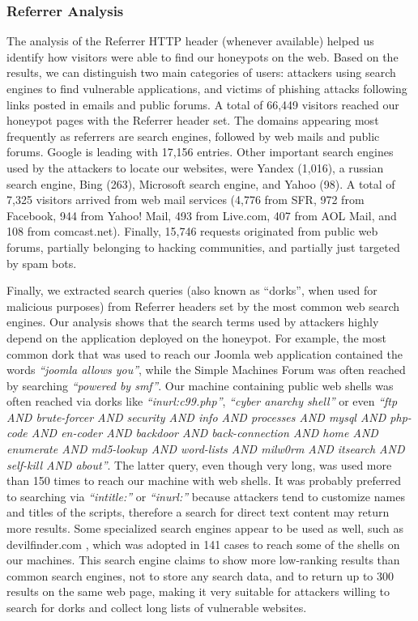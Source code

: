 \subsubsection{Referrer Analysis}

The analysis of the Referrer HTTP header (whenever available) helped us identify how visitors were able to find our honeypots on the web. Based on the results, we can distinguish two main categories of users: attackers using search engines to find vulnerable applications, and victims of phishing attacks following links posted in emails and public forums.
A total of 66,449 visitors reached our honeypot pages with the Referrer header set. The domains appearing most frequently as referrers are search engines, followed by web mails and public forums. Google is leading with 17,156 entries. Other important search engines used by the attackers to locate our websites, were Yandex (1,016), a russian search engine, Bing (263), Microsoft search engine, and Yahoo (98). A total of 7,325 visitors arrived from web mail services (4,776 from SFR, 972 from Facebook, 944 from Yahoo! Mail, 493 from Live.com, 407 from AOL Mail, and 108 from comcast.net). Finally, 15,746 requests originated from public web forums, partially belonging to hacking communities, and partially just targeted by spam bots.

Finally, we extracted search queries (also known as ``dorks'', when used for malicious purposes) from Referrer headers set by the most common web search engines. Our analysis shows that the search terms used by attackers highly depend on the application deployed on the honeypot. For example, the most common dork that was used to reach our Joomla web application contained the words \emph{``joomla allows you''}, while the Simple Machines Forum was often reached by searching \emph{``powered by smf''}. Our machine containing public web shells was often reached via dorks like \emph{``inurl:c99.php''}, \emph{``cyber anarchy shell''} or even \emph{``ftp AND brute-forcer AND security AND info AND processes AND mysql AND php-code AND en-coder AND backdoor AND back-connection AND home AND enumerate AND md5-lookup AND word-lists AND milw0rm AND itsearch AND self-kill AND about''}. The latter query, even though very long, was used more than 150 times to reach our machine with web shells. It was probably preferred to searching via \emph{``intitle:''} or \emph{``inurl:''} because attackers tend to customize names and titles of the scripts, therefore a search for direct text content may return more results. Some specialized search engines appear to be used as well, such as devilfinder.com \cite{devilfinder}, which was adopted in 141 cases to reach some of the shells on our machines. This search engine claims to show more low-ranking results than common search engines, not to store any search data, and to return up to 300 results on the same web page, making it very suitable for attackers willing to search for dorks and collect long lists of vulnerable websites.

